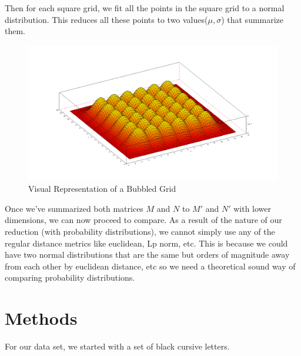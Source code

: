 \documentclass{article}
\begin{document}
Then for each square grid, we fit all the points in the square grid to a normal
distribution. This reduces all these points to two values($\mu, \sigma$) that
summarize them.

\begin{figure}[h!]
\begin{center}
\includegraphics[scale=0.16]{matrixbubblesample.png}
\caption{Visual Representation of a Bubbled Grid\cite{bubble}}
\end{center}
\end{figure}

Once we've summarized both matrices $M$ and $N$ to $M'$ and $N'$ with lower
dimensions, we can now proceed to compare. As a result of the nature of our
reduction (with probability distributions), we cannot simply use any of the
regular distance metrics like euclidean, Lp norm, etc. This is because we could
have two normal distributions that are the same but orders of magnitude away
from each other by euclidean distance, etc so we need a theoretical sound way
of comparing probability distributions.

\section{Methods}

For our data set, we started with a set of black cursive letters.
\end{document}
